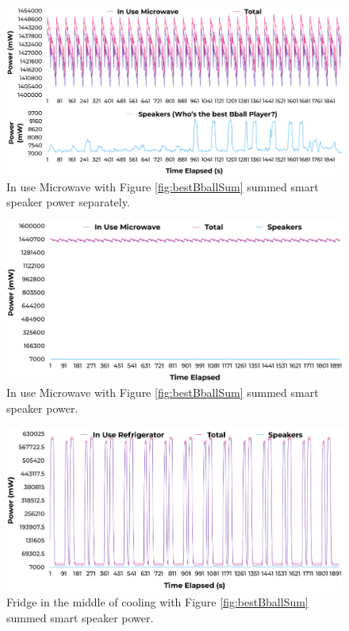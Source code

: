 \begin{figure}[H]
  \centering
  \includegraphics[width=1\textwidth]{figures/inUseuWaveNoiseSeperate.png}
  \caption{In use Microwave with Figure \ref{fig:bestBballSum} summed smart speaker power separately.}
  \label{fig:uWaveInUseSeperate}
\end{figure}

\begin{figure}[H]
  \centering
  \includegraphics[width=1\textwidth]{figures/inUseuWaveNoise.png}
  \caption{In use Microwave with Figure \ref{fig:bestBballSum} summed smart speaker power.}
  \label{fig:uWaveInUse}
\end{figure}

\begin{figure}[H]
  \centering
  \includegraphics[width=1\textwidth]{figures/inUseFridgeNoise.png}
  \caption{Fridge in the middle of cooling with Figure \ref{fig:bestBballSum} summed smart speaker power.}
  \label{fig:fridgeInUse}
\end{figure}

